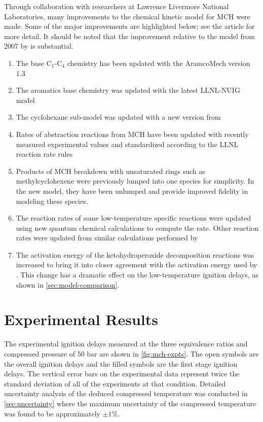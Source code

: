 \documentclass[12pt, letterpaper]{article}
\begin{document}
Through collaboration with researchers at Lawrence Livermore National
Laboratories, many improvements to the chemical kinetic model for MCH were
made. Some of the major improvements are highlighted below; see the article
for more detail. It should be noted that the improvement relative to the model
from 2007 by \textcite{Pitz2007} is substantial.

\begin{enumerate}
    \item The base C$_1$-C$_4$ chemistry has been updated with the AramcoMech
        version 1.3 \cite{Metcalfe2013}
    \item The aromatics base chemistry was updated with the latest LLNL-NUIG
        model \cite{Nakamura2014}
    \item The cyclohexane sub-model was updated with a new version from
        \textcite{Silke2007}
    \item Rates of abstraction reactions from MCH have been updated
        with recently measured experimental values \cite{Sivaramakrishnan2009}
        and standardized according to the LLNL reaction rate rules \cite{Sarathy2011b}
    \item Products of MCH breakdown with unsaturated rings such as
        methylcyclohexene were previously lumped into one species for
        simplicity. In the new model, they have been unlumped and
        provide improved fidelity in modeling these species. \cite{Pitz2013}
    \item The reaction rates of some low-temperature specific reactions were
        updated using new quantum chemical calculations to compute the rate.
        Other reaction rates were updated from similar calculations performed
        by \textcite{Fernandes2009}
    \item The activation energy of the ketohydroperoxide decomposition
        reactions was increased to bring it into closer agreement with
        the activation energy used by \textcite{Metcalfe2013}. This change
        has a dramatic effect on the low-temperature ignition delays, as shown
        in \autoref{sec:model-comparison}.
\end{enumerate}

\section{Experimental Results}
\label{sec:experimental-results}

The experimental ignition delays measured at the three equivalence ratios and
compressed pressure of 50 bar are shown in \autoref{fig:mch-expts}. The open symbols are the
overall ignition delays and the filled symbols are the first stage ignition
delays. The vertical error bars on the experimental data represent twice the
standard deviation of all of the experiments at that condition. Detailed
uncertainty analysis of the deduced compressed temperature was conducted
in \autoref{sec:uncertainty} where the maximum uncertainty of the compressed
temperature was found to be approximately $±1\%$.
\end{document}
